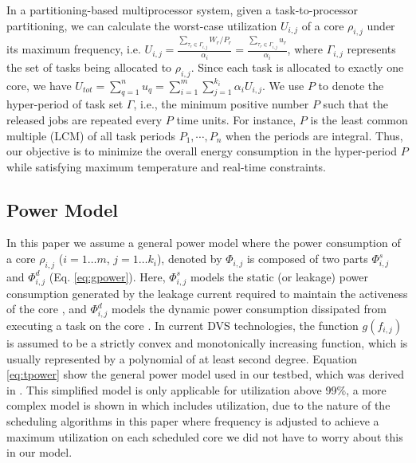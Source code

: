 \documentclass[conference]{IEEEtran}
\begin{document}
%
%
In a partitioning-based multiprocessor system, given a task-to-processor partitioning, we can calculate the worst-case utilization $U_{i,j}$ of a core $\rho_{i,j}$ under its maximum frequency, i.e. $U_{i,j}=\frac{\sum_{\tau_r \in  \Gamma_{i,j}} W_r/P_r}{\alpha_i}=\frac{\sum_{\tau_r \in  \Gamma_{i,j}} u_r}{\alpha_i}$, where $\Gamma_{i,j}$ represents the set of tasks being allocated to $\rho_{i,j}$. Since each task is allocated to exactly one core, we have $U_{tot} = \sum_{q=1}^{n} u_q = \sum_{i=1}^{m} \sum_{j=1}^{k_i} \alpha_i U_{i,j}$.
We use $P$ to denote the hyper-period of task set $\Gamma$, i.e., the minimum positive number $P$ such that the released jobs are repeated every $P$ time units. For instance, $P$ is the least common multiple (LCM) of all task periods $P_1, \cdots, P_n$ when the periods are integral. 
Thus, our objective is to minimize the overall energy consumption in the hyper-period $P$ while satisfying maximum temperature and real-time constraints.

\subsection{Power Model}
\label{power-model}
In this paper we assume a general power model where the power consumption of a core $\rho_{i,j}$  ($i=1\ldots m$, $j=1\ldots k_i$), denoted by $\Phi_{i,j}$ is composed of two 
parts $\Phi^{s}_{i,j}$ and $\Phi^{d}_{i,j}$ (Eq. \ref{eq:gpower}). Here, $\Phi^{s}_{i,j}$ models the static 
(or leakage) power consumption
generated by the leakage current required to maintain the activeness of the core \cite{Chen09,Langen06}, and
$\Phi^{d}_{i,j}$ models the dynamic power 
consumption dissipated from executing a task on the core \cite{Aydin03}. 
In current DVS technologies, the function $g(f_{i,j})$ is assumed to be a strictly convex and monotonically increasing function, 
which is usually represented by a polynomial of at least second degree.
Equation \ref{eq:tpower} show the general power model used in our testbed, which was derived in \cite{Li12}. This simplified model is only applicable for utilization above 99\%, a more complex model is shown in \cite{Li12} which includes utilization, due to the nature of the scheduling algorithms in this paper where frequency is adjusted to achieve a maximum utilization on each scheduled core we did not have to worry about this in our model.
\end{document}
